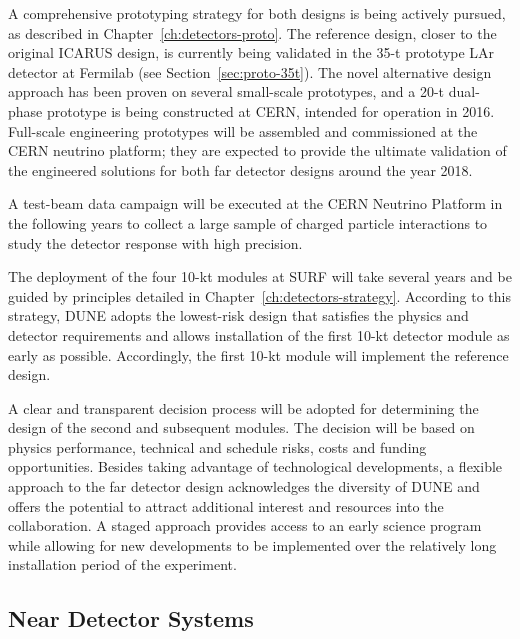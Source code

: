 A comprehensive prototyping strategy for both designs is being
actively pursued, as described in Chapter~\ref{ch:detectors-proto}.
The reference design, closer to the original ICARUS design, is
currently being validated in the 35-t prototype LAr detector at
Fermilab (see Section~\ref{sec:proto-35t}).  The novel alternative
design approach has been proven on several small-scale prototypes, and
a 20-t dual-phase prototype is being constructed at CERN, intended for
operation in 2016.  Full-scale engineering prototypes will be
assembled and commissioned at the CERN neutrino platform; 
they are expected to provide the ultimate validation of the engineered
solutions for both far detector designs around the year 2018.

A test-beam data campaign will be executed at the CERN Neutrino Platform in the following years to
collect a large sample of charged particle interactions to study the
detector response with high precision.

The deployment of the four 10-kt modules at SURF will take several
years and be guided by principles detailed in
Chapter~\ref{ch:detectors-strategy}. According to this strategy, DUNE
adopts the lowest-risk design that satisfies the physics and detector
requirements and allows installation of the first 10-kt detector
module as early as possible.  Accordingly, the first 10-kt module will
implement the reference design.  

A clear and transparent decision process will be adopted for
determining the design of the second and subsequent modules.  The
decision will be based on physics performance, technical and schedule
risks, costs and funding opportunities.  Besides taking advantage of
technological developments, a flexible approach to the far detector
design acknowledges the diversity of DUNE and offers the potential to
attract additional interest and resources into the collaboration. A
staged approach provides access to an early science program while
allowing for new developments to be implemented over the relatively
long installation period of the experiment.

\subsection{Near Detector Systems}
\label{sec:intro-dune-near-det}

